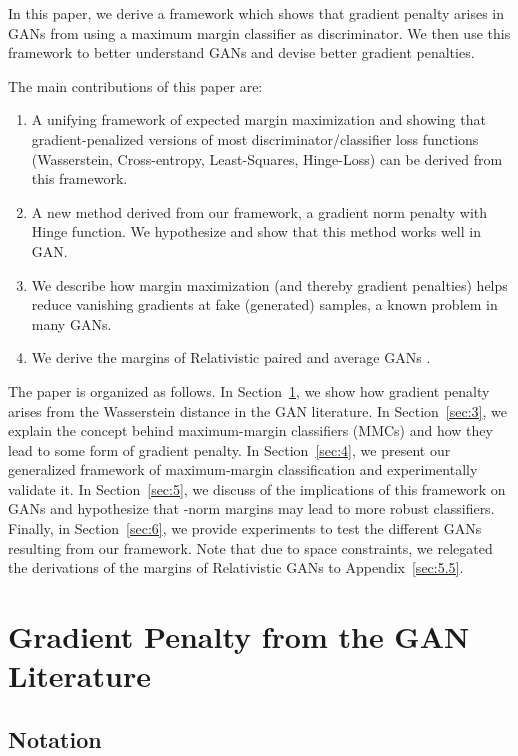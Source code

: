 \documentclass{article}
\begin{document}
    In this paper, we derive a framework which shows that gradient penalty arises in GANs from using a maximum margin classifier as discriminator. We then use this framework to better understand GANs and devise better gradient penalties. 
    
    The main contributions of this paper are:
	\begin{enumerate}
	    \item A unifying framework of expected margin maximization and showing that gradient-penalized versions of most discriminator/classifier loss functions (Wasserstein, Cross-entropy, Least-Squares, Hinge-Loss) can be derived from this framework.
	    \item A new method derived from our framework, a  gradient norm penalty with Hinge function. We hypothesize and show that this method works well in GAN.
	    \item We describe how margin maximization (and thereby gradient penalties) helps reduce vanishing gradients at fake (generated) samples, a known problem in many GANs.
	    \item We derive the margins of Relativistic paired and average GANs \citep{jolicoeur2018relativistic,jolicoeur2019relativistic}.
	\end{enumerate}
	
	The paper is organized as follows. In Section~\ref{sec:2}, we show how gradient penalty arises from the Wasserstein distance in the GAN literature. In Section~\ref{sec:3}, we explain the concept behind maximum-margin classifiers (MMCs) and how they lead to some form of gradient penalty. In Section~\ref{sec:4}, we present our generalized framework of maximum-margin classification and experimentally validate it. In Section~\ref{sec:5}, we discuss of the implications of this framework on GANs and hypothesize that -norm margins may lead to more robust classifiers. Finally, in Section~\ref{sec:6}, we provide experiments to test the different GANs resulting from our framework. Note that due to space constraints, we relegated the derivations of the margins of Relativistic GANs to Appendix~\ref{sec:5.5}.

\section{Gradient Penalty from the GAN Literature}
\label{sec:2}
\subsection{Notation}
\label{sec:notation}
\end{document}
